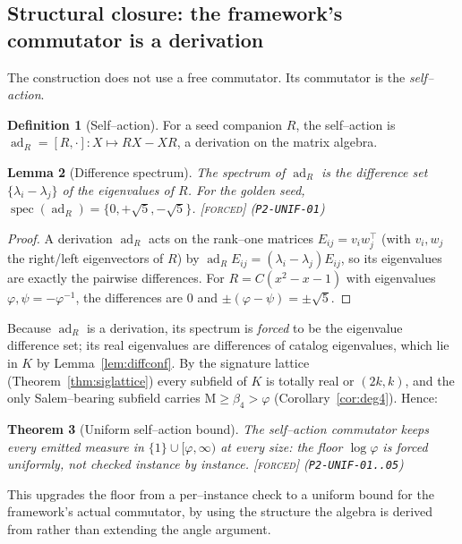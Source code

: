 \documentclass[11pt]{article}
\theoremstyle{plain}
\newtheorem{theorem}{Theorem}[section]
\newtheorem{lemma}[theorem]{Lemma}
\theoremstyle{definition}
\newtheorem{definition}[theorem]{Definition}
\theoremstyle{remark}
\newcommand{\forced}{\textcolor{forcedc}{\textsc{[forced]}}}
\newcommand{\Mah}{\mathrm{M}}
\newcommand{\spec}{\operatorname{spec}}
\newcommand{\ad}{\operatorname{ad}}
\begin{document}
\subsection{Structural closure: the framework's commutator is a derivation}
The construction does not use a free commutator. Its commutator is the \emph{self--action}.

\begin{definition}[Self--action]\label{def:selfaction}
For a seed companion $R$, the self--action is $\ad_R=[R,\cdot]:X\mapsto RX-XR$, a derivation on the matrix algebra.
\end{definition}

\begin{lemma}[Difference spectrum]\label{lem:diffspec}
The spectrum of $\ad_R$ is the difference set $\{\lambda_i-\lambda_j\}$ of the eigenvalues of $R$. For the golden seed, $\spec(\ad_R)=\{0,+\sqrt5,-\sqrt5\}$. \forced{} {\small(\texttt{P2-UNIF-01})}
\end{lemma}
\begin{proof}
A derivation $\ad_R$ acts on the rank--one matrices $E_{ij}=v_i w_j^{\!\top}$ (with $v_i,w_j$ the right/left eigenvectors of $R$) by $\ad_R E_{ij}=(\lambda_i-\lambda_j)E_{ij}$, so its eigenvalues are exactly the pairwise differences. For $R=C(x^2-x-1)$ with eigenvalues $\varphi,\psi=-\varphi^{-1}$, the differences are $0$ and $\pm(\varphi-\psi)=\pm\sqrt5$.
\end{proof}

Because $\ad_R$ is a derivation, its spectrum is \emph{forced} to be the eigenvalue difference set; its real eigenvalues are differences of catalog eigenvalues, which lie in $K$ by Lemma~\ref{lem:diffconf}. By the signature lattice (Theorem~\ref{thm:siglattice}) every subfield of $K$ is totally real or $(2k,k)$, and the only Salem--bearing subfield carries $\Mah\ge\beta_4>\varphi$ (Corollary~\ref{cor:deg4}). Hence:

\begin{theorem}[Uniform self--action bound]\label{thm:uniform}
The self--action commutator keeps every emitted measure in $\{1\}\cup[\varphi,\infty)$ at \emph{every} size: the floor $\log\varphi$ is forced uniformly, not checked instance by instance. \forced{} {\small(\texttt{P2-UNIF-01..05})}
\end{theorem}

This upgrades the floor from a per--instance check to a uniform bound for the framework's actual commutator, by using the structure the algebra is derived from rather than extending the angle argument.
\end{document}
